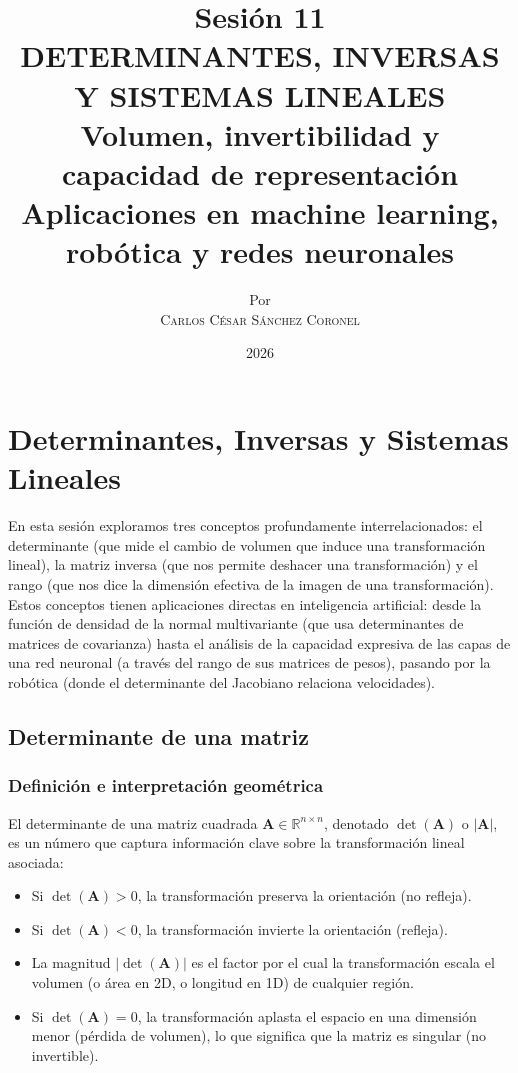 \documentclass[12pt,a4paper,openany,oneside]{book}
\title{
    \textbf{Sesión 11} \\ 
    \Huge \textbf{DETERMINANTES, INVERSAS Y SISTEMAS LINEALES} \\
    \large Volumen, invertibilidad y capacidad de representación \\
    \normalsize Aplicaciones en machine learning, robótica y redes neuronales
}
\author{
    \small Por \\ \vspace{0.2cm}
    \Large \textsc{Carlos César Sánchez Coronel}
}
\date{2026}
\begin{document}
\maketitle
\tableofcontents
{}

\chapter{Determinantes, Inversas y Sistemas Lineales}

En esta sesión exploramos tres conceptos profundamente interrelacionados: el determinante (que mide el cambio de volumen que induce una transformación lineal), la matriz inversa (que nos permite deshacer una transformación) y el rango (que nos dice la dimensión efectiva de la imagen de una transformación). Estos conceptos tienen aplicaciones directas en inteligencia artificial: desde la función de densidad de la normal multivariante (que usa determinantes de matrices de covarianza) hasta el análisis de la capacidad expresiva de las capas de una red neuronal (a través del rango de sus matrices de pesos), pasando por la robótica (donde el determinante del Jacobiano relaciona velocidades).

\section{Determinante de una matriz}

\subsection{Definición e interpretación geométrica}
El determinante de una matriz cuadrada $\mathbf{A} \in \mathbb{R}^{n \times n}$, denotado $\det(\mathbf{A})$ o $|\mathbf{A}|$, es un número que captura información clave sobre la transformación lineal asociada:

\begin{itemize}
    \item Si $\det(\mathbf{A}) > 0$, la transformación preserva la orientación (no refleja).
    \item Si $\det(\mathbf{A}) < 0$, la transformación invierte la orientación (refleja).
    \item La magnitud $|\det(\mathbf{A})|$ es el factor por el cual la transformación escala el volumen (o área en 2D, o longitud en 1D) de cualquier región.
    \item Si $\det(\mathbf{A}) = 0$, la transformación aplasta el espacio en una dimensión menor (pérdida de volumen), lo que significa que la matriz es singular (no invertible).
\end{itemize}
\end{document}
